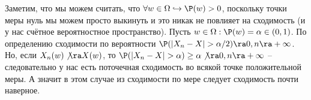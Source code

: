 \begin{solution}
    Заметим, что мы можем считать, что $\forall w \in \Omega \hookrightarrow \P(w) > 0$, поскольку точки меры нуль мы можем просто выкинуть и это никак не повлияет на сходимость (и у нас счётное вероятностное пространство).
    Пусть $w \in \Omega: \P(w) = \alpha \in (0, 1)$.
    По определению сходимости по вероятности $\P(|X_n - X| > \alpha/2) \ra 0, n \ra +\infty$.
    Но, если $X_n(w) \not\ra X(w)$, то $\P(|X_n - X| > \alpha) \geq \alpha \not\ra 0, n \ra +\infty$ -- следовательно у нас есть поточечная сходимость во всякой точке положительной меры.
    А значит в этом случае из сходимости по мере следует сходимость почти наверное.
\end{solution}